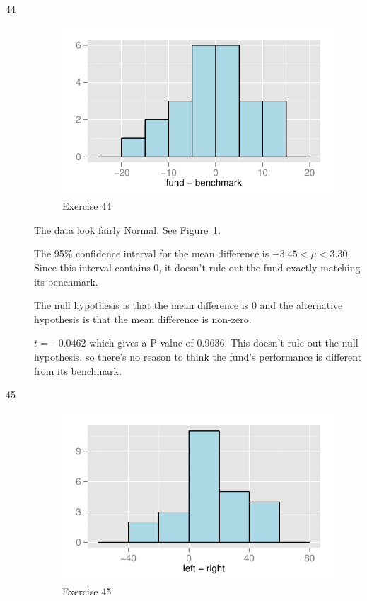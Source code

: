 \documentclass[letterpaper, landscape]{exam}
\begin{document}
\begin{description}
\begin{enumerate}[label = (\alph*)]
        \end{enumerate}

      \item[44]
        \begin{figure}[H]
          \centering
          \includegraphics[scale = 1.0]{figures/ex44.pdf}
          \caption{Exercise 44}\label{fig:ex44}
        \end{figure}

        The data look fairly Normal. See Figure~\ref{fig:ex44}.

        The 95\% confidence interval for the mean difference is $-3.45 < \mu < 3.30$.
        Since this interval contains 0, it doesn't rule out the fund exactly matching
        its benchmark.

        The null hypothesis is that the mean difference is 0 and the alternative
        hypothesis is that the mean difference is non-zero.

        $t = -0.0462$ which gives a P-value of 0.9636. This doesn't rule out the
        null hypothesis, so there's no reason to think the fund's performance is
        different from its benchmark.
        
      \item[45]
        \begin{figure}[H]
          \centering
          \includegraphics[scale = 1.0]{figures/ex45.pdf}
          \caption{Exercise 45}\label{fig:ex45}
        \end{figure}


\end{description}
\end{document}
